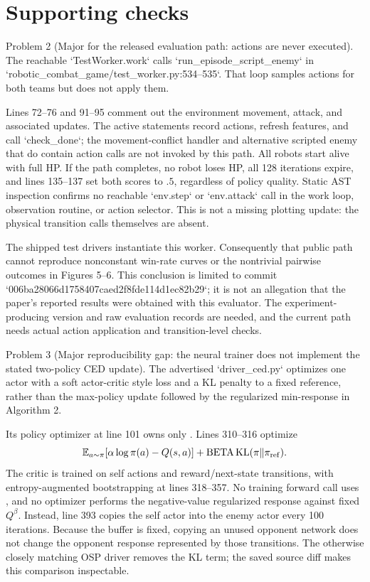 \documentclass[10pt]{article}
\begin{document}
\section*{Supporting checks}
Problem 2 (Major for the released evaluation path: actions are never executed).  The reachable `TestWorker.work` calls `run\_episode\_script\_enemy` in `robotic\_combat\_game/test\_worker.py:534--535`. That loop samples actions for both teams but does not apply them.\par
Lines 72–76 and 91–95 comment out the environment movement, attack, and associated updates. The active statements record actions, refresh features, and call `check\_done`; the movement-conflict handler and alternative scripted enemy that do contain action calls are not invoked by this path. All robots start alive with full HP. If the path completes, no robot loses HP, all 128 iterations expire, and lines 135–137 set both scores to \(.5\), regardless of policy quality. Static AST inspection confirms no reachable `env.step` or `env.attack` call in the work loop, observation routine, or action selector. This is not a missing plotting update: the physical transition calls themselves are absent.\par
The shipped test drivers instantiate this worker. Consequently that public path cannot reproduce nonconstant win-rate curves or the nontrivial pairwise outcomes in Figures 5–6. This conclusion is limited to commit `006ba28066d1758407caed2f8fde114d1ec82b29`; it is not an allegation that the paper’s reported results were obtained with this evaluator. The experiment-producing version and raw evaluation records are needed, and the current path needs actual action application and transition-level checks.\par
Problem 3 (Major reproducibility gap: the neural trainer does not implement the stated two-policy CED update).  The advertised `driver\_ced.py` optimizes one actor with a soft actor-critic style loss and a KL penalty to a fixed reference, rather than the max-policy update followed by the regularized min-response in Algorithm 2.\par
Its policy optimizer at line 101 owns only . Lines 310–316 optimize \[\mathbb E_{a\sim\pi}[\alpha\log\pi(a)-Q(s,a)]+\mathrm{BETA}\,\mathrm{KL}(\pi\|\pi_{\rm ref}).\] The critic is trained on self actions and reward/next-state transitions, with entropy-augmented bootstrapping at lines 318–357. No training forward call uses , and no optimizer performs the negative-value regularized response against fixed \(Q^\beta\). Instead, line 393 copies the self actor into the enemy actor every 100 iterations. Because the buffer is fixed, copying an unused opponent network does not change the opponent response represented by those transitions. The otherwise closely matching OSP driver removes the KL term; the saved source diff makes this comparison inspectable.\par
\end{document}
